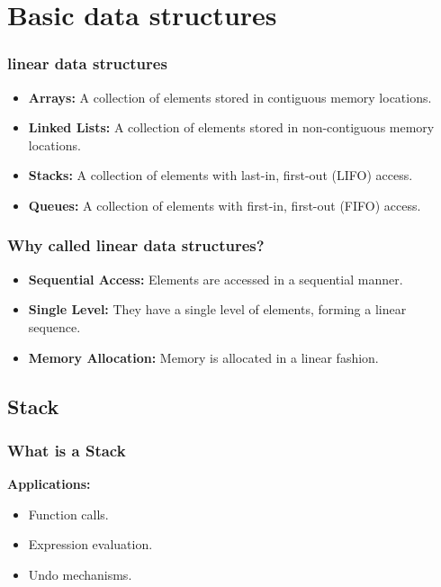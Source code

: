 \section{Basic data structures}

\begin{frame}
    \frametitle{linear data structures}
    \begin{itemize}
        \item \textbf{Arrays:} A collection of elements stored in contiguous memory locations.
        \item \textbf{Linked Lists:} A collection of elements stored in non-contiguous memory locations.
        \item \textbf{Stacks:} A collection of elements with last-in, first-out (LIFO) access.
        \item \textbf{Queues:} A collection of elements with first-in, first-out (FIFO) access.
    \end{itemize}
\end{frame} 

\begin{frame}
    \frametitle{Why called linear data structures?}
    \begin{itemize}
        \item \textbf{Sequential Access:} Elements are accessed in a sequential manner.
        \item \textbf{Single Level:} They have a single level of elements, forming a linear sequence.
        \item \textbf{Memory Allocation:} Memory is allocated in a linear fashion.
    \end{itemize}
\end{frame}
\subsection{Stack}
\begin{frame}
\frametitle{What is a Stack}
    \item \textbf{Applications:}
        \begin{itemize}
            \item Function calls.
            \item Expression evaluation.
            \item Undo mechanisms.
        \end{itemize}
\end{frame}


